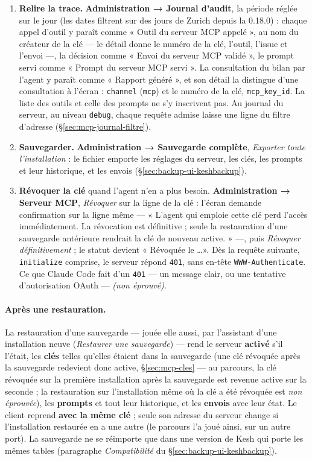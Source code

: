 \documentclass[a4paper,11pt,oneside]{article}
\begin{document}
\begin{enumerate}
    \item \textbf{Relire la trace.} \textbf{Administration → Journal d'audit}, la période réglée sur le jour (les dates filtrent sur des jours de Zurich depuis la 0.18.0) : chaque appel d'outil y paraît comme « Outil du serveur MCP appelé », au nom du créateur de la clé --- le détail donne le numéro de la clé, l'outil, l'issue et l'envoi ---, la décision comme « Envoi du serveur MCP validé », le prompt servi comme « Prompt du serveur MCP servi ». La consultation du bilan par l'agent y paraît comme « Rapport généré », et son détail la distingue d'une consultation à l'écran : \texttt{channel} (\texttt{mcp}) et le numéro de la clé, \texttt{mcp\_key\_id}. La liste des outils et celle des prompts ne s'y inscrivent pas. Au journal du serveur, au niveau \texttt{debug}, chaque requête admise laisse une ligne du filtre d'adresse (\S\ref{sec:mcp-journal-filtre}).
    \item \textbf{Sauvegarder.} \textbf{Administration → Sauvegarde complète}, \emph{Exporter toute l'installation} : le fichier  emporte les réglages du serveur, les clés, les prompts et leur historique, et les envois (\S\ref{sec:backup-ui-keshbackup}).
    \item \textbf{Révoquer la clé} quand l'agent n'en a plus besoin. \textbf{Administration → Serveur MCP}, \emph{Révoquer} sur la ligne de la clé : l'écran demande confirmation sur la ligne même --- « L'agent qui emploie cette clé perd l'accès immédiatement. La révocation est définitive ; seule la restauration d'une sauvegarde antérieure rendrait la clé de nouveau active. » ---, puis \emph{Révoquer définitivement} ; le statut devient « Révoquée le \ldots ». Dès la requête suivante, \texttt{initialize} comprise, le serveur répond \texttt{401}, sans en-tête \texttt{WWW-Authenticate}. Ce que Claude Code fait d'un \texttt{401} --- un message clair, ou une tentative d'autorisation OAuth --- \emph{(non éprouvé)}.
\end{enumerate}

\paragraph{Après une restauration.} La restauration d'une sauvegarde --- jouée elle aussi, par l'assistant d'une installation neuve (\emph{Restaurer une sauvegarde}) --- rend le serveur \textbf{activé} s'il l'était, les \textbf{clés} telles qu'elles étaient dans la sauvegarde (une clé révoquée après la sauvegarde redevient donc active, \S\ref{sec:mcp-cles} --- au parcours, la clé révoquée sur la première installation après la sauvegarde est revenue active sur la seconde ; la restauration sur l'installation même où la clé a été révoquée est \emph{non éprouvée}), les \textbf{prompts} et tout leur historique, et les \textbf{envois} avec leur état. Le client reprend \textbf{avec la même clé} ; seule son adresse du serveur change si l'installation restaurée en a une autre (le parcours l'a joué ainsi, sur un autre port). La sauvegarde ne se réimporte que dans une version de Kesh qui porte les mêmes tables (paragraphe \emph{Compatibilité} du \S\ref{sec:backup-ui-keshbackup}).
\end{document}
